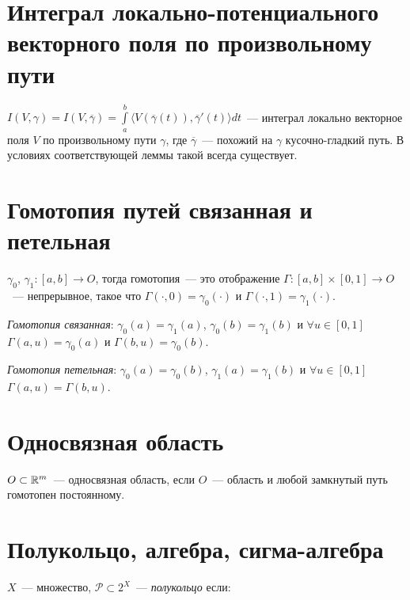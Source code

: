 \documentclass{article}
\begin{document}
    \newpage
    
    \section{Интеграл локально-потенциального векторного поля по произвольному пути}
    
        $I(V, \gamma) = I(V, \overline{\gamma}) = \int\limits^b_a \langle V \left( \overline{\gamma}(t) \right), \overline{\gamma}'(t) \rangle dt$~--- интеграл локально векторное поля $V$ по произвольному пути $\gamma$, где $\overline{\gamma}$~--- похожий на $\gamma$ кусочно-гладкий путь. В условиях соответствующей леммы такой всегда существует.
        
    \newpage
    
    \section{Гомотопия путей связанная и петельная}
    
        $\gamma_0$, $\gamma_1 : [a, b] \rightarrow O$, тогда гомотопия~--- это отображение $\Gamma : [a, b] \times [0, 1] \rightarrow O$~--- непрерывное, такое что $\Gamma(\cdot, 0) = \gamma_0(\cdot)$ и $\Gamma(\cdot, 1) = \gamma_1(\cdot)$.
        
        \textit{Гомотопия связанная}: $\gamma_0(a) = \gamma_1(a)$, $\gamma_0(b) = \gamma_1(b)$ и $\forall u \in [0, 1]$ $\Gamma(a, u) = \gamma_0(a)$ и $\Gamma(b, u) = \gamma_0(b)$.
        
        \textit{Гомотопия петельная}: $\gamma_0(a) = \gamma_0(b)$, $\gamma_1(a) = \gamma_1(b)$ и $\forall u \in [0, 1]$ $\Gamma(a, u) = \Gamma(b, u)$.
        
    \newpage
    
    \section{Односвязная область}
    
        $O \subset \mathbb{R}^m$~--- односвязная область, если $O$~--- область и любой замкнутый путь гомотопен постоянному.
        
    \newpage
    
    \section{Полукольцо, алгебра, сигма-алгебра}
    
        $X$~--- множество, $\mathcal{P} \subset 2^X$~--- \textit{полукольцо} если:
        
\end{document}

